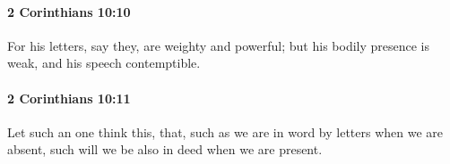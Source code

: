 		\paragraph{2 Corinthians 10:10} %
			\label{2CORINTHIANS-10-10}

			For his letters, say they, are weighty and powerful; but his bodily presence is weak, and his speech contemptible.

			\begin{framed}
			\scriptsize
				\begin{compactdesc}
					\item[SBLG] 
				\end{compactdesc}
			\end{framed}

		\paragraph{2 Corinthians 10:11} %
			\label{2CORINTHIANS-10-11}

			Let such an one think this, that, such as we are in word by letters when we are absent, such will we be also in deed when we are present.

